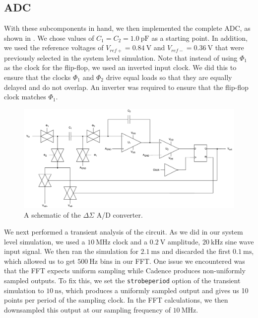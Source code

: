 \documentclass[journal,hidelinks]{IEEEtran}
\begin{document}
\subsection{ADC}

With these subcomponents in hand, we then implemented the complete ADC, as shown in . We chose values of $C_1 = C_2 = \SI{1.0}{\pico\farad}$ as a starting point. In addition, we used the reference voltages of $V_{ref+} = \SI{0.84}{\volt}$ and $V_{ref-} = \SI{0.36}{\volt}$ that were previously selected in the system level simulation. Note that instead of using $\Phi_1$ as the clock for the flip-flop, we used an inverted input clock. We did this to ensure that the clocks $\Phi_1$ and $\Phi_2$ drive equal loads so that they are equally delayed and do not overlap. An inverter was required to ensure that the flip-flop clock matches $\Phi_1$.

\begin{figure}[!htb]
  \centering
  \includegraphics[width=\textwidth]{diagrams/adc.pdf}
  \caption{A schematic of the $\Delta \Sigma$ A/D converter.}
  \label{fig:adc}
\end{figure}

We next performed a transient analysis of the circuit. As we did in our system level simulation, we used a $\SI{10}{\mega\hertz}$ clock and a $\SI{0.2}{\volt}$ amplitude, $\SI{20}{\kilo\hertz}$ sine wave input signal. We then ran the simulation for $\SI{2.1}{\milli\second}$ and discarded the first $\SI{0.1}{\milli\second}$, which allowed us to get $\SI{500}{\hertz}$ bins in our FFT. One issue we encountered was that the FFT expects uniform sampling while Cadence produces non-uniformly sampled outputs. To fix this, we set the \verb|strobeperiod| option of the transient simulation to $\SI{10}{\nano\second}$, which produces a uniformly sampled output and gives us 10 points per period of the sampling clock. In the FFT calculations, we then downsampled this output at our sampling frequency of $\SI{10}{\mega\hertz}$.
\end{document}
